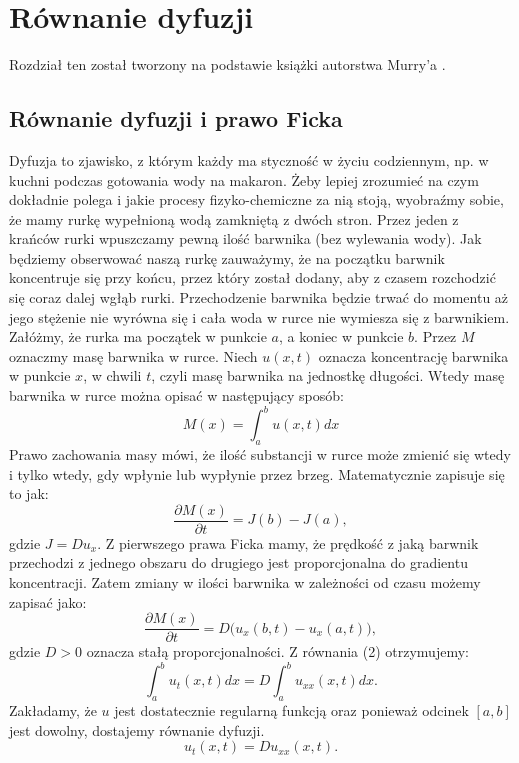 \documentclass[a4paper,12pt]{article}
\begin{document}
\section{Równanie dyfuzji}

Rozdział ten został tworzony na podstawie książki autorstwa Murry'a \cite{mb}.

\subsection{Równanie dyfuzji i prawo Ficka}

Dyfuzja to zjawisko, z którym każdy ma styczność w życiu codziennym, np. w kuchni podczas gotowania wody na makaron. Żeby lepiej zrozumieć na czym dokładnie polega i jakie procesy fizyko-chemiczne za nią stoją, wyobraźmy sobie, że mamy rurkę wypełnioną wodą zamkniętą z dwóch stron. Przez jeden z krańców rurki wpuszczamy pewną ilość barwnika (bez wylewania wody). Jak będziemy obserwować naszą rurkę zauważymy, że na początku barwnik koncentruje się przy końcu, przez który został dodany, aby z czasem rozchodzić się coraz dalej wgłąb rurki. Przechodzenie barwnika będzie trwać do momentu aż jego stężenie nie wyrówna się i cała woda w rurce nie wymiesza się z barwnikiem.     
\\
Załóżmy, że rurka ma początek w punkcie $a$, a koniec w punkcie $b$. Przez $M$ oznaczmy masę barwnika w rurce. Niech $u(x,t)$ oznacza koncentrację barwnika w punkcie $x$, w chwili $t$, czyli masę barwnika na jednostkę długości. Wtedy masę barwnika w rurce można opisać w następujący sposób:
\begin{equation}
    M(x)=\int_a^b u(x,t) dx 
\end{equation}
Prawo zachowania masy mówi, że ilość substancji w rurce może zmienić się wtedy i tylko wtedy, gdy wpłynie lub wypłynie przez brzeg. Matematycznie zapisuje się to jak:
$$\frac{\partial M(x)}{\partial t}= J(b) - J(a), $$
gdzie $J=Du_x$.
Z pierwszego prawa Ficka mamy, że prędkość z jaką barwnik przechodzi z jednego obszaru do drugiego jest proporcjonalna do gradientu koncentracji. Zatem zmiany w ilości barwnika w zależności od czasu możemy zapisać jako:
\begin{equation}
    \frac{\partial M(x)}{\partial t}= D\Big(u_x(b,t)-u_x(a,t)\Big),
\end{equation}
gdzie $D>0$ oznacza stałą proporcjonalności.
Z równania (2) otrzymujemy:
$$ \int_a^b u_t(x,t) dx = D\int_a^b u_{xx}(x,t)dx. $$ 
Zakładamy, że  $u$ jest dostatecznie regularną funkcją oraz ponieważ odcinek $[a,b]$ jest dowolny, dostajemy równanie dyfuzji.
\begin{equation}
    u_t(x,t)=Du_{xx}(x,t).
\end{equation}
\end{document}

